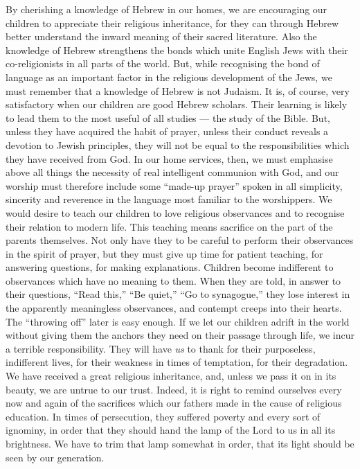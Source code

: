By cherishing a knowledge of Hebrew in
our homes, we are encouraging our children
to appreciate their religious inheritance, for
they can through Hebrew better understand
the inward meaning of their sacred
literature. Also the knowledge of Hebrew
strengthens the bonds which unite English
Jews with their co-religionists in all parts of
the world. But, while recognising the bond
of language as an important factor in the
religious development of the Jews, we must
remember that a knowledge of Hebrew is
not Judaism. It is, of course, very satisfactory
when our children are good Hebrew
scholars. Their learning is likely to lead
them to the most useful of all studies — the
study of the Bible. But, unless they have
acquired the habit of prayer, unless their
conduct reveals a devotion to Jewish
principles, they will not be equal to the
responsibilities which they have received
from God. In our home services, then, we
must emphasise above all things the necessity
of real intelligent communion with God,
and our worship must therefore include
some “made-up prayer” spoken in all
simplicity, sincerity and reverence in the
language most familiar to the worshippers.
We would desire to teach our children to
love religious observances and to recognise
their relation to modern life. This teaching
means sacrifice on the part of the parents
themselves. Not only have they to be
careful to perform their observances in
the spirit of prayer, but they must give up
time for patient teaching, for answering
questions, for making explanations. Children
become indifferent to observances
which have no meaning to them. When they
are told, in answer to their questions, “Read
this,” “Be quiet,” “Go to synagogue,” they
lose interest in the apparently meaningless
observances, and contempt creeps into
their hearts. The “throwing off” later is
easy enough. If we let our children adrift
in the world without giving them the
anchors they need on their passage through
life, we incur a terrible responsibility. They
will have \textsl{us} to thank for their purposeless,
indifferent lives, for their weakness in times
of temptation, for their degradation. We
have received a great religious inheritance,
and, unless we pass it on in its beauty, we
are untrue to our trust. Indeed, it is right
to remind ourselves every now and again of
the sacrifices which our fathers made in the
cause of religious education. In times of
persecution, they suffered poverty and
every sort of ignominy, in order that they
should hand the lamp of the Lord to us in
all its brightness. We have to trim that
lamp somewhat in order, that its light
should be seen by our generation.

